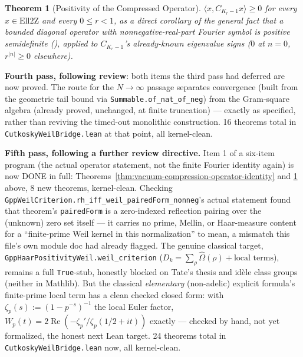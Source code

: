 \documentclass{report}
\newtheorem{theorem}{Theorem}[chapter]
\theoremstyle{definition}
\begin{document}
\begin{theorem}[Positivity of the Compressed Operator]
  \label{thm:vacuum-compressed-operator-positive}
  \leanok
  $\langle x,C_{K_r-1}x\rangle\ge0$ for every $x\in\mathrm{Ell2Z}$ and every $0\le r<1$,
  as a direct corollary of the general fact that a bounded diagonal operator with
  nonnegative-real-part Fourier symbol is positive semidefinite
  (), applied to $C_{K_r-1}$'s already-known
  eigenvalue signs ($0$ at $n=0$, $r^{|n|}\ge0$ elsewhere).
\end{theorem}

\textbf{Fourth pass, following review}: both items the third pass had deferred are now
proved. The route for the $N\to\infty$ passage separates convergence (built from the
geometric tail bound via \texttt{Summable.of\_nat\_of\_neg}) from the Gram-square
algebra (already proved, unchanged, at finite truncation) --- exactly as specified,
rather than reviving the timed-out monolithic construction. 16 theorems total in
\texttt{CutkoskyWeilBridge.lean} at that point, all kernel-clean.

\textbf{Fifth pass, following a further review directive.} Item 1 of a six-item program
(the actual operator statement, not the finite Fourier identity again) is now DONE in
full: Theorems~\ref{thm:vacuum-compression-operator-identity} and
\ref{thm:vacuum-compressed-operator-positive} above, 8 new theorems, kernel-clean.
Checking \texttt{GppWeilCriterion.rh\_iff\_weil\_pairedForm\_nonneg}'s actual statement
found that theorem's \texttt{pairedForm} is a zero-indexed reflection pairing over the
(unknown) zero set itself --- it carries no prime, Mellin, or Haar-measure content for a
``finite-prime Weil kernel in this normalization'' to mean, a mismatch this file's own
module doc had already flagged. The genuine classical target,
\texttt{GppHaarPositivityWeil.weil\_criterion} ($D_k=\sum_\rho\hat\Omega(\rho)+\text{local
terms}$), remains a full \texttt{True}-stub, honestly blocked on Tate's thesis and idèle
class groups (neither in Mathlib). But the classical \emph{elementary} (non-adelic)
explicit formula's finite-prime local term has a clean checked closed form: with
$\zeta_p(s):=(1-p^{-s})^{-1}$ the local Euler factor, $W_p(t)=2\operatorname{Re}(-\zeta_p'/
\zeta_p(1/2+it))$ exactly --- checked by hand, not yet formalized, the honest next Lean
target. 24 theorems total in \texttt{CutkoskyWeilBridge.lean} now, all kernel-clean.
\end{document}
